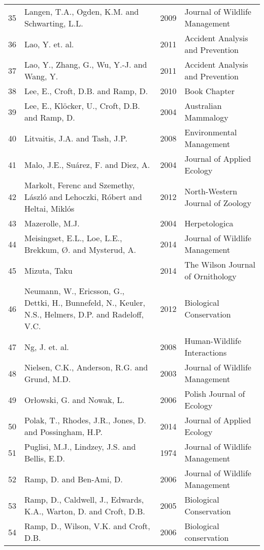 \begin{longtable}[c]{p{.75cm}p{6cm}p{1.25cm}p{5.5cm}}
   35 & Langen, T.A., Ogden, K.M. and Schwarting, L.L. & 2009 & Journal of Wildlife Management \\ 
   36 & Lao, Y. et. al. & 2011 & Accident Analysis and Prevention \\ 
   37 & Lao, Y., Zhang, G., Wu, Y.-J. and Wang, Y. & 2011 & Accident Analysis and Prevention \\ 
   38 & Lee, E., Croft, D.B. and Ramp, D. & 2010 & Book Chapter \\ 
   39 & Lee, E., Klöcker, U., Croft, D.B. and Ramp, D. & 2004 & Australian Mammalogy \\ 
   40 & Litvaitis, J.A. and Tash, J.P. & 2008 & Environmental Management \\ 
   41 & Malo, J.E., Suárez, F. and Diez, A. & 2004 & Journal of Applied Ecology \\ 
   42 & Markolt, Ferenc and Szemethy, L{\'a}szl{\'o} and Lehoczki, R{\'o}bert and Heltai, Mikl{\'o}s & 2012 & North-Western Journal of Zoology \\ 
   43 & Mazerolle, M.J. & 2004 & Herpetologica \\ 
   44 & Meisingset, E.L., Loe, L.E., Brekkum, Ø. and Mysterud, A. & 2014 & Journal of Wildlife Management \\ 
   45 & Mizuta, Taku & 2014 & The Wilson Journal of Ornithology \\ 
   46 & Neumann, W., Ericsson, G., Dettki, H., Bunnefeld, N., Keuler, N.S., Helmers, D.P. and Radeloff, V.C. & 2012 & Biological Conservation  \\ 
   47 & Ng, J. et. al. & 2008 & Human-Wildlife Interactions \\ 
   48 & Nielsen, C.K., Anderson, R.G. and Grund, M.D. & 2003 & Journal of Wildlife Management \\ 
   49 & Orłowski, G. and Nowak, L. & 2006 & Polish Journal of Ecology \\ 
   50 & Polak, T., Rhodes, J.R., Jones, D. and Possingham, H.P. & 2014 & Journal of Applied Ecology \\ 
   51 & Puglisi, M.J., Lindzey, J.S. and Bellis, E.D. & 1974 & Journal of Wildlife Management \\ 
   52 & Ramp, D. and Ben-Ami, D. & 2006 & Journal of Wildlife Management \\ 
   53 & Ramp, D., Caldwell, J., Edwards, K.A., Warton, D. and Croft, D.B. & 2005 & Biological Conservation \\ 
   54 & Ramp, D., Wilson, V.K. and Croft, D.B. & 2006 & Biological conservation \\ 

\end{longtable}
